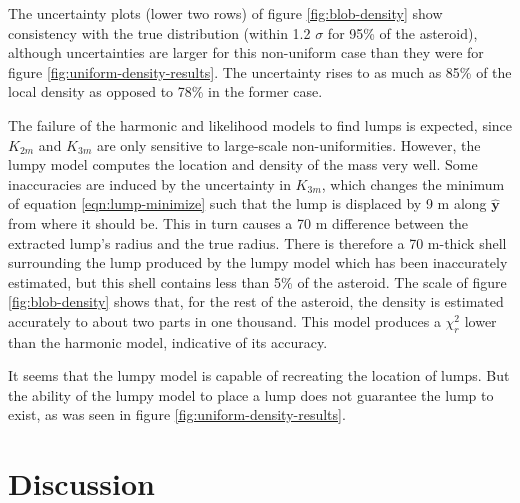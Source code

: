 \documentclass[fleqn,usenatbib]{mnras}
\newcommand{\unit}[1]{\bm{\hat{#1}}}
\begin{document}
The uncertainty plots (lower two rows) of figure \ref{fig:blob-density}  show consistency with the true distribution (within 1.2 $\sigma$ for 95\% of the asteroid), although uncertainties are larger for this non-uniform case than they were for figure \ref{fig:uniform-density-results}. The uncertainty rises to as much as 85\% of the local density as opposed to 78\% in the former case.

The failure of the harmonic and likelihood models to find lumps is expected, since $K_{2 m}$ and $K_{3 m}$ are only sensitive to large-scale non-uniformities. However, the lumpy model computes the location and density of the mass very well. Some inaccuracies are induced by the uncertainty in $K_{3m}$, which changes the minimum of equation \ref{eqn:lump-minimize} such that the lump is displaced by 9 m along $\unit y$ from where it should be. This in turn causes a 70 m difference between the extracted lump's radius and the true radius. There is therefore a 70 m-thick shell surrounding the lump produced by the lumpy model which has been inaccurately estimated, but this shell contains less than 5\% of the asteroid. The scale of figure \ref{fig:blob-density} shows that, for the rest of the asteroid, the density is estimated accurately to about two parts in one thousand. This model produces a $\chi^2_r$ lower than the harmonic model, indicative of its accuracy.

It seems that the lumpy model is capable of recreating the location of lumps. But the ability of the lumpy model to place a lump does not guarantee the lump to exist, as was seen in figure \ref{fig:uniform-density-results}.


\section{Discussion}
\label{sec:discussion}

\end{document}
